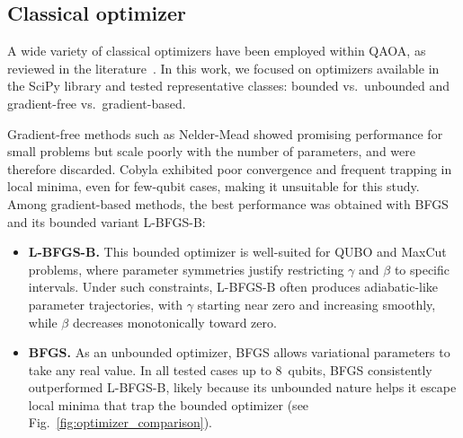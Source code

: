 \subsection{Classical optimizer}

A wide variety of classical optimizers have been employed within QAOA, as reviewed in the literature~\cite{blekos_review_2024}.  
In this work, we focused on optimizers available in the SciPy library and tested representative classes: bounded vs.\ unbounded and gradient-free vs.\ gradient-based.  

Gradient-free methods such as Nelder-Mead showed promising performance for small problems but scale poorly with the number of parameters, and were therefore discarded. Cobyla exhibited poor convergence and frequent trapping in local minima, even for few-qubit cases, making it unsuitable for this study. Among gradient-based methods, the best performance was obtained with BFGS and its bounded variant L-BFGS-B:

\begin{itemize}
    \item \textbf{L-BFGS-B.}  
    This bounded optimizer is well-suited for QUBO and MaxCut problems, where parameter symmetries justify restricting $\gamma$ and $\beta$ to specific intervals. Under such constraints, L-BFGS-B often produces adiabatic-like parameter trajectories, with $\gamma$ starting near zero and increasing smoothly, while $\beta$ decreases monotonically toward zero.  

    \item \textbf{BFGS.}  
    As an unbounded optimizer, BFGS allows variational parameters to take any real value. In all tested cases up to 8~qubits, BFGS consistently outperformed L-BFGS-B, likely because its unbounded nature helps it escape local minima that trap the bounded optimizer (see Fig.~\ref{fig:optimizer_comparison}).
\end{itemize}

